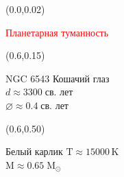 \documentclass[aspectratio=169]{beamer}
\begin{document}
{
\begin{frame}
\begin{textblock}{0.6}(0.0,0.02)
\begin{center}
\textcolor{red}{Планетарная туманность}
\end{center}
\end{textblock}
\begin{textblock}{0.25}(0.6,0.15)
\begin{block}{NGC 6543}
Кошачий глаз \\
$d \approx 3300 \; \mathrm{\text{св. лет}}$ \\
$\varnothing \approx 0.4 \; \mathrm{\text{св. лет}}$
\end{block}
\end{textblock}
\begin{textblock}{0.25}(0.6,0.50)
\begin{block}{Белый карлик}
$\mathrm{T} \approx  15000 \, \mathrm{K}$ \\
$\mathrm{M} \approx  0.65 \; \mathrm{M}_\odot$
\end{block}
\end{textblock}
\end{frame}
}
\end{document}
